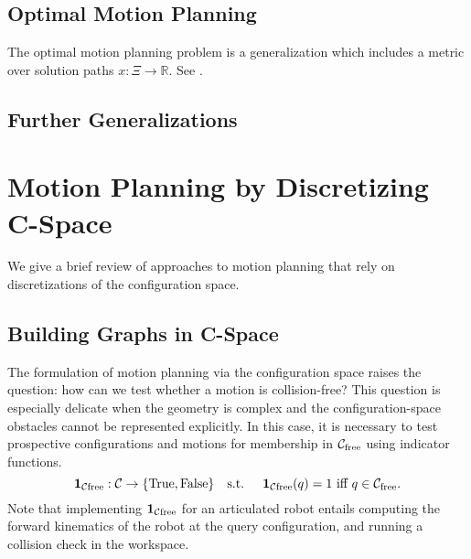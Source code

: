 \subsection{Optimal Motion Planning}

The optimal motion planning problem is a generalization which
includes a metric over solution paths
$x : \Xi \rightarrow \mathbb{R}$.
See \citep{karaman2011samplingoptimal}.

\subsection{Further Generalizations}


\section{Motion Planning by Discretizing C-Space}

We give a brief review of approaches to motion planning that rely
on discretizations of the configuration space.

\subsection{Building Graphs in C-Space}

The formulation of motion planning via the configuration space
raises the question:
how can we test whether a motion is collision-free?
This question is especially delicate when the geometry is complex
and the configuration-space obstacles cannot be represented explicitly.
In this case,
it is necessary to test prospective configurations and motions
for membership in $\mathcal{C}_{\mbox{\scriptsize free}}$ using indicator functions.
\begin{equation}
   \mathbf{1}_{\mathcal{C}\mbox{\scriptsize free}} : \mathcal{C} \rightarrow \{ \mbox{True}, \mbox{False} \} 
   \mbox{\quad s.t. \quad}
   \mathbf{1}_{\mathcal{C}\mbox{\scriptsize free}}(q) = 1 \mbox{ iff } q \in \mathcal{C}_{\mbox{\scriptsize free}}.
\end{equation}
Note that implementing $\mathbf{1}_{\mathcal{C}\mbox{\scriptsize free}}$ for an articulated robot
entails computing the forward kinematics of the robot at the
query configuration,
and running a collision check in the workspace.

